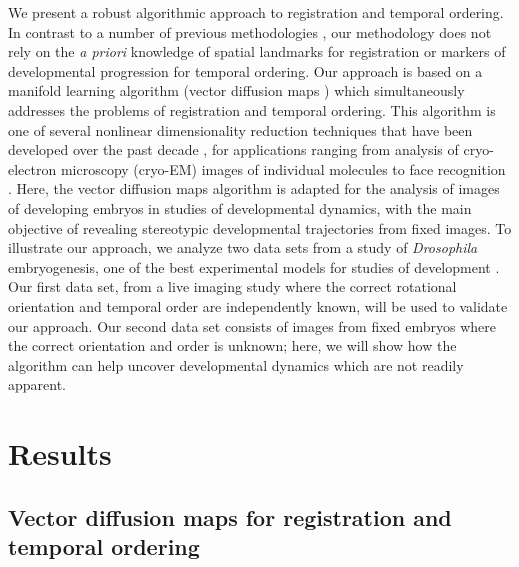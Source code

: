 \documentclass{pnastwo}
\begin{document}
\begin{article}
We present a robust algorithmic approach to registration and temporal ordering.
%
In contrast to a number of previous methodologies \cite{zitova2003image, rowley1998rotation, hajnal2010medical, greenspan1994rotation, zhao2003face}, our methodology does not rely on the {\em a priori} knowledge of spatial landmarks for registration or markers of developmental progression for temporal ordering.
%
Our approach is based on a manifold learning algorithm (vector diffusion maps \cite{singer2012vector}) which simultaneously addresses the problems of registration and temporal ordering. 
%
This algorithm is one of several nonlinear dimensionality reduction techniques that have been developed over the past decade \cite{Belkin2003, coifman2005geometric, coifman2006geometric, tenenbaum2000global, roweis2000nonlinear}, for
applications ranging from analysis of cryo-electron microscopy (cryo-EM) images of individual molecules  \cite{zhao2014rotationally, singer2011viewing} to face recognition \cite{lafon2006data}.
%
Here, the vector diffusion maps algorithm is adapted for the analysis of images of developing embryos in studies of developmental dynamics, with the main objective of revealing stereotypic developmental trajectories from fixed images.
%
To illustrate our approach, we analyze two data sets from a study of {\it Drosophila} embryogenesis, one of the best experimental models for studies of development \cite{jaeger2012drosophila}.
%
Our first data set, from a live imaging study where the correct rotational orientation and temporal order are independently known, will be used to validate our approach.
%
Our second data set consists of images from fixed embryos where the correct orientation and order is unknown; here, we will show how the algorithm can help uncover developmental dynamics which are not readily apparent. 


\section{Results}

\subsection{Vector diffusion maps for registration and temporal ordering}


\end{article}
\end{document}
